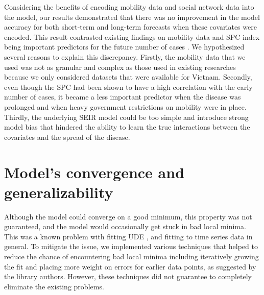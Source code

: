Considering the benefits of encoding mobility data and social network data into the model, our results demonstrated that there was no improvement in the model accuracy for both short-term and long-term forecasts when these covariates were encoded.
This result contrasted existing findings on mobility data and \gls{SPC} index being important predictors for the future number of cases \cite{changMobilityNetworkModels2021,kuchlerGeographicSpreadCOVID192020,arikInterpretableSequenceLearning,liSubstantialUndocumentedInfection2020}.
We hypothesized several reasons to explain this discrepancy.
Firstly, the mobility data that we used was not as granular and complex as those used in existing researches because we only considered datasets that were available for Vietnam.
Secondly, even though the \gls{SPC} had been shown to have a high correlation with the early number of cases, it became a less important predictor when the disease was prolonged and when heavy government restrictions on mobility were in place.
Thirdly, the underlying \gls{SEIR} model could be too simple and introduce strong model bias that hindered the ability to learn the true interactions between the covariates and the spread of the disease.

\section{Model's convergence and generalizability}

Although the model could converge on a good minimum, this property was not guaranteed, and the model would occasionally get stuck in bad local minima.
This was a known problem with fitting \gls{UDE} \cite{rackauckasUniversalDifferentialEquations2020}, and fitting to time series data in general.
To mitigate the issue, we implemented various techniques that helped to reduce the chance of encountering bad local minima including iteratively growing the fit and placing more weight on errors for earlier data points, as suggested by the library authors.
However, these techniques did not guarantee to completely eliminate the existing problems.

